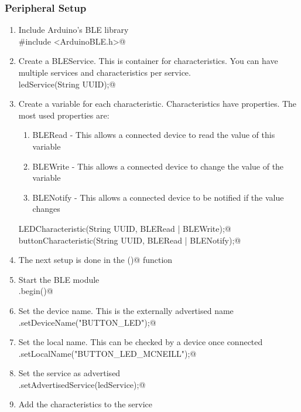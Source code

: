 \subsubsection{Peripheral Setup}
\begin{enumerate}
    \item Include Arduino's BLE library \\
        \lstinline@#include <ArduinoBLE.h>@ 
    \item Create a BLEService. This is container for characteristics. You can
            have multiple services and characteristics per service.\\
        \lstinline@BLEService ledService(String UUID);@
    \item Create a variable for each characteristic. Characteristics have properties. 
            The most used properties are:
        \begin{enumerate}
            \item BLERead - This allows a connected device to read the value of this variable
            \item BLEWrite - This allows a connected device to change the value of the variable
            \item BLENotify -  This allows a connected device to be notified if the value changes
        \end{enumerate}
        \lstinline@BLEByteCharacteristic LEDCharacteristic(String UUID, BLERead | BLEWrite);@ \\
        \lstinline@BLEByteCharacteristic buttonCharacteristic(String UUID, BLERead | BLENotify);@
    \item The next setup is done in the \lstinline@setup()@ function
    \item Start the BLE module \\
        \lstinline@BLE.begin()@ 
    \item Set the device name. This is the externally advertised name \\
        \lstinline@BLE.setDeviceName("BUTTON_LED");@ 
    \item Set the local name. This can be checked by a device once connected \\
        \lstinline@BLE.setLocalName("BUTTON_LED_MCNEILL");@ 
    \item Set the service as advertised \\
        \lstinline@BLE.setAdvertisedService(ledService);@
    \item Add the characteristics to the service \\

\end{enumerate}
